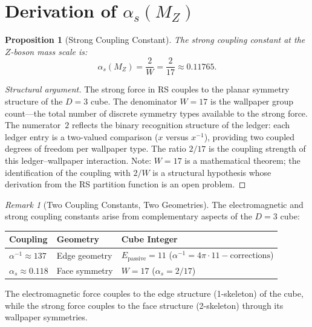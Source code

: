 \documentclass[12pt,a4paper]{article}
\newtheorem{proposition}[theorem]{Proposition}
\theoremstyle{definition}
\theoremstyle{remark}
\newtheorem{remark}[theorem]{Remark}
\begin{document}
\section{Derivation of $\alpha_s(M_Z)$}
\label{sec:derivation}

\begin{proposition}[Strong Coupling Constant]
\label{thm:alpha-s}
The strong coupling constant at the $Z$-boson mass scale is:
\begin{equation}
  \boxed{\alpha_s(M_Z) = \frac{2}{W} = \frac{2}{17}
  \approx 0.11765.}
\end{equation}
\end{proposition}

\begin{proof}[Structural argument]
The strong force in RS couples to the planar symmetry structure
of the $D = 3$ cube.  The denominator $W = 17$ is the wallpaper
group count---the total number of discrete symmetry types
available to the strong force.  The numerator~$2$ reflects the
binary recognition structure of the ledger: each ledger entry
is a two-valued comparison ($x$ versus $x^{-1}$), providing
two coupled degrees of freedom per wallpaper type.  The ratio
$2/17$ is the coupling strength of this ledger--wallpaper
interaction.  Note: $W = 17$ is a mathematical theorem; the
identification of the coupling with $2/W$ is a structural
hypothesis whose derivation from the RS partition function
is an open problem.
\end{proof}

\begin{remark}[Two Coupling Constants, Two Geometries]
\label{rem:contrast}
The electromagnetic and strong coupling constants arise from
complementary aspects of the $D = 3$ cube:
\begin{center}
\renewcommand{\arraystretch}{1.3}
\begin{tabular}{lll}
\toprule
\textbf{Coupling} & \textbf{Geometry} &
  \textbf{Cube Integer} \\
\midrule
$\alpha^{-1} \approx 137$ & Edge geometry &
  $E_{\mathrm{passive}} = 11$
  \;($\alpha^{-1} = 4\pi \cdot 11 - \mathrm{corrections}$) \\
$\alpha_s \approx 0.118$ & Face symmetry &
  $W = 17$ \;($\alpha_s = 2/17$) \\
\bottomrule
\end{tabular}
\end{center}
The electromagnetic force couples to the edge structure
(1-skeleton) of the cube, while the strong force couples to
the face structure (2-skeleton) through its wallpaper symmetries.
\end{remark}
\end{document}
